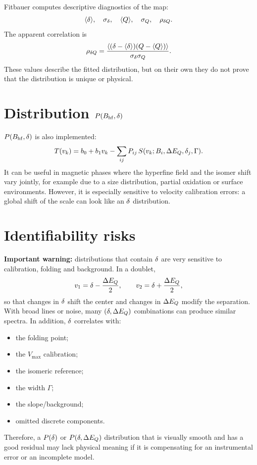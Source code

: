 Fitbauer computes descriptive diagnostics of the map:
\begin{align}
  \langle\delta\rangle,\quad \sigma_{\delta},\quad
  \langle Q\rangle,\quad \sigma_Q,\quad
  \rho_{\delta Q}.
\end{align}
The apparent correlation is
\begin{equation}
  \rho_{\delta Q}=\frac{\langle(\delta-\langle\delta\rangle)(Q-\langle Q\rangle)\rangle}
  {\sigma_{\delta}\sigma_Q}.
\end{equation}
These values describe the fitted distribution, but on their own they do not
prove that the distribution is unique or physical.

\section{Distribution $P(B_{\mathrm{hf}},\delta)$}

$P(B_{\mathrm{hf}},\delta)$ is also implemented:
\begin{equation}
  T(v_k)=b_0+b_1v_k-\sum_{ij}P_{ij}\,
  S(v_k;B_i,\Delta E_Q,\delta_j,\Gamma).
\end{equation}
It can be useful in magnetic phases where the hyperfine field and the isomer
shift vary jointly, for example due to a size distribution, partial oxidation or
surface environments. However, it is especially sensitive to velocity
calibration errors: a global shift of the scale can look like an $\delta$
distribution.

\section{Identifiability risks}

\textbf{Important warning:} distributions that contain $\delta$ are very sensitive
to calibration, folding and background. In a doublet,
\begin{equation}
  v_1=\delta-\frac{\Delta E_Q}{2},\qquad v_2=\delta+\frac{\Delta E_Q}{2},
\end{equation}
so that changes in $\delta$ shift the center and changes in $\Delta E_Q$ modify the
separation. With broad lines or noise, many $(\delta,\Delta E_Q)$ combinations can produce
similar spectra. In addition, $\delta$ correlates with:
\begin{itemize}
  \item the folding point;
  \item the $V_{\max}$ calibration;
  \item the isomeric reference;
  \item the width $\Gamma$;
  \item the slope/background;
  \item omitted discrete components.
\end{itemize}
Therefore, a $P(\delta)$ or $P(\delta,\Delta E_Q)$ distribution that is visually smooth and
has a good residual may lack physical meaning if it is compensating for an
instrumental error or an incomplete model.

